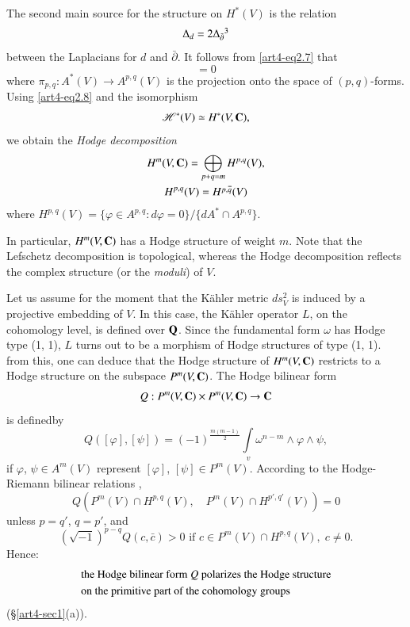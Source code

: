 The second main source for the structure on $H^\ast(V)$ is the relation
\begin{equation}
\Delta_d = 2 \Delta_{\bar{\partial}}\footnotemark[3]{} \label{art4-eq2.7}
\end{equation}
between the Laplacians for $d$ and $\bar{\partial}$. It follows from \eqref{art4-eq2.7} that 
\begin{equation}
[\Delta, \pi_{p,q}] =0 \label{art4-eq2.8}
\end{equation}
where $\pi_{p,q} : A^\ast(V) \to A^{p,q} (V)$ is the projection onto the space of $(p,q)$-forms. Using \eqref{art4-eq2.8} and the isomorphism
$$
\mathscr{H}^\ast (V) \simeq H^\ast (V, \mathbf{C}), 
$$
we obtain the \textit{Hodge decomposition}
\begin{gather*}
H^m (V, \mathbf{C}) = \bigoplus_{p+q=m} H^{p,q} (V), \\
H^{p,q} (V) = \bar{H^{p,q} (V)}
\end{gather*}
where $H^{p,q} (V) = \{\varphi \in A^{p,q}: d \varphi = 0\} / \{d A^\ast \cap A^{p,q}\}$.

In particular, $H^m (V, \mathbf{C})$ has a Hodge structure of weight $m$. Note that the Lefschetz decomposition is topological, whereas the Hodge decomposition reflects the complex structure (or the \textit{moduli}) of $V$.

Let us assume for the moment that the K\"{a}hler metric $ds^2_V$ is induced by a projective embedding of $V$. In this case, the K\"{a}hler operator $L$, on the cohomology level, is defined over $\mathbf{Q}$. Since the fundamental form $\omega$ has Hodge type (1, 1), $L$ turns out to be a morphism of Hodge structures of type (1, 1). from this, one can deduce that the Hodge structure of $H^m (V, \mathbf{C})$ restricts to a Hodge structure on the subspace $P^m (V, \mathbf{C})$. The Hodge bilinear form
$$
Q : P^m (V, \mathbf{C}) \times P^m (V, \mathbf{C}) \to \mathbf{C}
$$
is defined\pageoriginale by
$$
Q ([\varphi], [\psi]) = (-1)^{\frac{m(m-1)}{2}} \int\limits_v \omega^{n-m} \wedge \varphi \wedge \psi,
$$
if $\varphi$, $\psi \in A^m (V)$ represent $[\varphi]$, $[\psi] \in P^m (V)$. According to the Hodge-Riemann bilinear relations \cite{art4-key45},
$$
Q (P^m (V) \cap H^{p,q} (V), \quad P^m (V) \cap H^{p',q'} (V)) =0
$$
unless $p=q'$, $q= p'$, and 
$$
(\sqrt{-1})^{p-q} Q (c, \bar{c}) > 0 \text{ if } c \in P^m (V) \cap H^{p,q} (V), \; c \neq 0.
$$
Hence:
\begin{align}
& \text{the Hodge bilinear form $Q$ polarizes the Hodge structure}\notag \\
& \text{on the primitive part of the cohomology groups }\label{art4-eq2.9}
\end{align}
(\cf \S \ref{art4-sec1}(a)).

